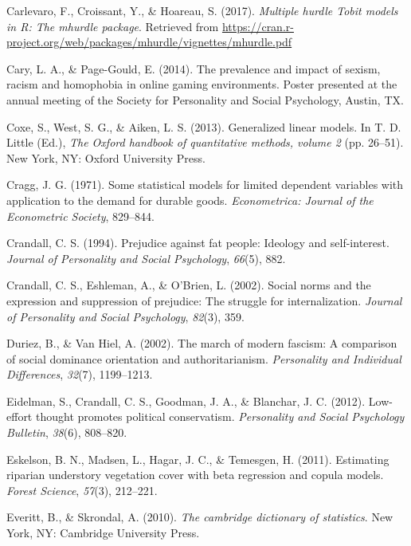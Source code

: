 \documentclass[english,man]{apa6}
\newcounter{author}
\theoremstyle{definition}
\theoremstyle{definition}
\theoremstyle{remark}
\begin{document}
\hypertarget{ref-carlevaro2016multiple}{}
Carlevaro, F., Croissant, Y., \& Hoareau, S. (2017). \emph{Multiple
hurdle Tobit models in R: The mhurdle package}. Retrieved from
\url{https://cran.r-project.org/web/packages/mhurdle/vignettes/mhurdle.pdf}

\hypertarget{ref-cary2014prevalence}{}
Cary, L. A., \& Page-Gould, E. (2014). The prevalence and impact of
sexism, racism and homophobia in online gaming environments. Poster
presented at the annual meeting of the Society for Personality and
Social Psychology, Austin, TX.

\hypertarget{ref-coxe2013generalized}{}
Coxe, S., West, S. G., \& Aiken, L. S. (2013). Generalized linear
models. In T. D. Little (Ed.), \emph{The Oxford handbook of quantitative
methods, volume 2} (pp. 26--51). New York, NY: Oxford University Press.

\hypertarget{ref-cragg1971some}{}
Cragg, J. G. (1971). Some statistical models for limited dependent
variables with application to the demand for durable goods.
\emph{Econometrica: Journal of the Econometric Society}, 829--844.

\hypertarget{ref-crandall1994prejudice}{}
Crandall, C. S. (1994). Prejudice against fat people: Ideology and
self-interest. \emph{Journal of Personality and Social Psychology},
\emph{66}(5), 882.

\hypertarget{ref-crandall2002social}{}
Crandall, C. S., Eshleman, A., \& O'Brien, L. (2002). Social norms and
the expression and suppression of prejudice: The struggle for
internalization. \emph{Journal of Personality and Social Psychology},
\emph{82}(3), 359.

\hypertarget{ref-duriez2002march}{}
Duriez, B., \& Van Hiel, A. (2002). The march of modern fascism: A
comparison of social dominance orientation and authoritarianism.
\emph{Personality and Individual Differences}, \emph{32}(7), 1199--1213.

\hypertarget{ref-eidelman2012low}{}
Eidelman, S., Crandall, C. S., Goodman, J. A., \& Blanchar, J. C.
(2012). Low-effort thought promotes political conservatism.
\emph{Personality and Social Psychology Bulletin}, \emph{38}(6),
808--820.

\hypertarget{ref-eskelson2011estimating}{}
Eskelson, B. N., Madsen, L., Hagar, J. C., \& Temesgen, H. (2011).
Estimating riparian understory vegetation cover with beta regression and
copula models. \emph{Forest Science}, \emph{57}(3), 212--221.

\hypertarget{ref-everitt2002cambridge}{}
Everitt, B., \& Skrondal, A. (2010). \emph{The cambridge dictionary of
statistics}. New York, NY: Cambridge University Press.
\end{document}
